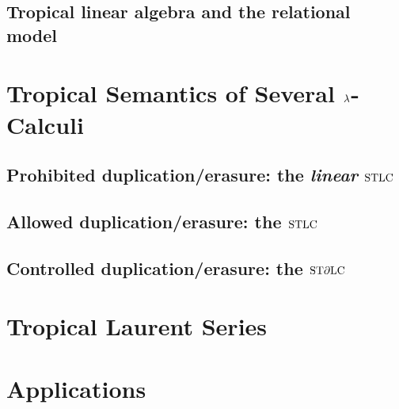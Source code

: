 \documentclass[conference]{IEEEtran}
\begin{document}
\subsection{Tropical linear algebra and the relational model%
}

%

\section{Tropical Semantics of Several $\lambda$-Calculi}\label{section3}
\subsection{Prohibited duplication/erasure: the \emph{linear} $\mathrm{STLC}$}


\subsection{Allowed duplication/erasure: the $\mathrm{STLC}$}
%

\subsection{Controlled duplication/erasure: the $\mathrm{ST}\partial\mathrm{LC}$}
%


\section{Tropical Laurent Series}\label{section4}
%


\section{Applications}\label{sec:app}\label{section5}
%

\end{document}

